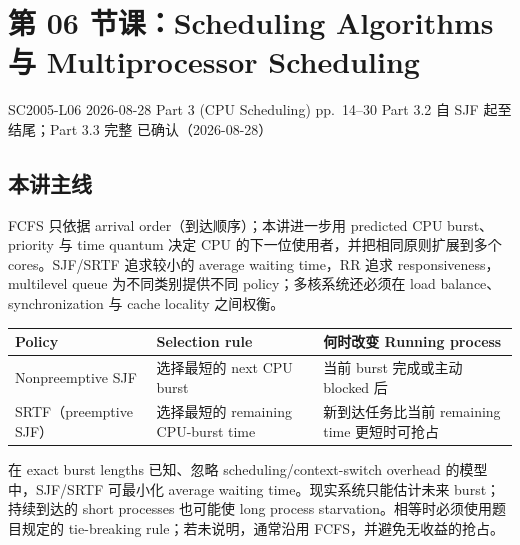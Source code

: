 
\section{第 06 节课：Scheduling Algorithms 与 Multiprocessor Scheduling}
\label{lecture:SC2005-L06}

\lecturemeta
  {SC2005-L06}
  {2026-08-28}
  {Part 3 (CPU Scheduling)}
  {pp.~14--30}
  {Part 3.2 自 SJF 起至结尾；Part 3.3 完整}
  {已确认（2026-08-28）}

\subsection{本讲主线}

FCFS 只依据 arrival order（到达顺序）；本讲进一步用 predicted CPU burst、priority 与 time quantum 决定 CPU 的下一位使用者，并把相同原则扩展到多个 cores。SJF/SRTF 追求较小的 average waiting time，RR 追求 responsiveness，multilevel queue 为不同类别提供不同 policy；多核系统还必须在 load balance、synchronization 与 cache locality 之间权衡。



\begin{center}
\small
\begin{tabularx}{0.96\textwidth}{@{}>{\raggedright\arraybackslash}p{2.9cm}XX@{}}
  \toprule
  Policy & Selection rule & 何时改变 Running process \\
  \midrule
  Nonpreemptive SJF & 选择最短的 next CPU burst & 当前 burst 完成或主动 blocked 后 \\
  SRTF（preemptive SJF） & 选择最短的 remaining CPU-burst time & 新到达任务比当前 remaining time 更短时可抢占 \\
  \bottomrule
\end{tabularx}
\end{center}

在 exact burst lengths 已知、忽略 scheduling/context-switch overhead 的模型中，SJF/SRTF 可最小化 average waiting time。现实系统只能估计未来 burst；持续到达的 short processes 也可能使 long process starvation。相等时必须使用题目规定的 tie-breaking rule；若未说明，通常沿用 FCFS，并避免无收益的抢占。

